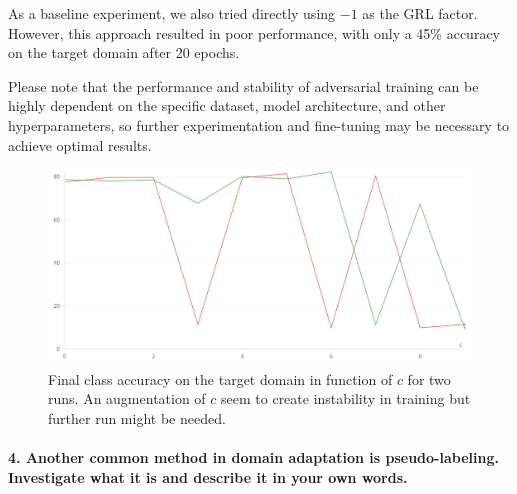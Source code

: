 As a baseline experiment, we also tried directly using $-1$ as the GRL factor. However, this approach resulted in poor performance, with only a 45\% accuracy on the target domain after 20 epochs.

Please note that the performance and stability of adversarial training can be highly dependent on the specific dataset, model architecture, and other hyperparameters, so further experimentation and fine-tuning may be necessary to achieve optimal results.

\begin{figure}[H]
    \centering
    \includegraphics[width=.5\textwidth]{GLR_factor_exp.png}
    \caption{Final class accuracy on the target domain in function of $c$ for two runs. An augmentation of $c$ seem to create instability in training but further run might be needed.}
    \label{fig:glr}
\end{figure}






\paragraph*{4. Another common method in domain adaptation is pseudo-labeling. Investigate what it is and describe it in your own words.}

